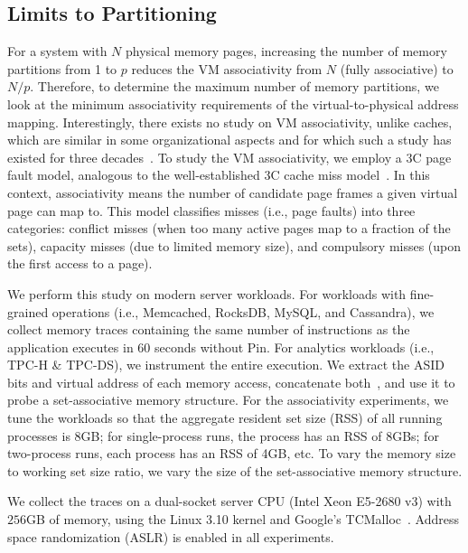\subsection{Limits to Partitioning}
For a system with $N$ physical memory pages, increasing the number of memory partitions from 1 to $p$ reduces the VM associativity from $N$ (fully associative) to $N/p$. Therefore, to determine the maximum number of memory partitions, we look at the minimum associativity requirements of the virtual-to-physical address mapping. Interestingly, there exists no study on VM associativity, unlike caches, which are similar in some organizational aspects and for which such a study has existed for three decades~\cite{hill:aspects}. To study the VM associativity, we employ a 3C page fault model, analogous to the well-established 3C cache miss model~\cite{hill:aspects}. In this context, associativity means the number of candidate page frames a given virtual page can map to. This model classifies misses (i.e., page faults) into three categories: conflict misses (when too many active pages map to a fraction of the sets), capacity misses (due to limited memory size), and compulsory misses (upon the first access to a page). 

We perform this study on modern server workloads. For workloads with fine-grained operations (i.e., Memcached, RocksDB, MySQL, and Cassandra), we collect memory traces containing the same number of instructions as the application executes in 60 seconds without Pin. For analytics workloads (i.e., TPC-H \& TPC-DS), we instrument the entire execution. We extract the ASID bits and virtual address of each memory access, concatenate both~\cite{basu:reducing, yoon:revisiting},  and use it to probe a set-associative memory structure. For the associativity experiments, we tune the workloads so that the aggregate resident set size (RSS) of all running processes is 8GB; for single-process runs, the process has an RSS of 8GBs; for two-process runs, each process has an RSS of 4GB,  etc. To vary the memory size to working set size ratio, we vary the size of the set-associative memory structure. 

We collect the traces on a dual-socket server CPU (Intel Xeon E5-2680 v3) with $256$GB of memory, using the Linux 3.10 kernel and Google's TCMalloc~\cite{google:tcmalloc}. Address space randomization (ASLR) is enabled in all experiments.

